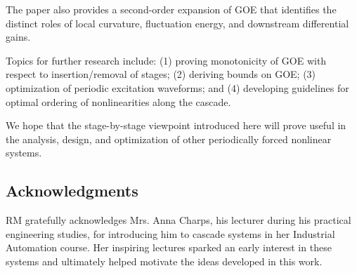 \documentclass[onecolumn]{IEEEtran}
\begin{document}
  The paper also provides a
   second-order expansion of GOE
   that identifies the distinct roles of local curvature, fluctuation energy, and downstream differential gains. 

 
Topics for further research include: 
(1) proving monotonicity of GOE with respect to insertion/removal of stages;
(2) deriving bounds on GOE;
(3) optimization of periodic excitation waveforms; 
and (4) developing guidelines 
for optimal ordering of nonlinearities along the  cascade.

 We hope that the stage-by-stage viewpoint introduced here will prove useful in the analysis,  design, and optimization  of  other periodically forced nonlinear systems.



\subsection*{Acknowledgments}
RM gratefully acknowledges Mrs. Anna Charps, his lecturer during his practical engineering studies, for introducing him to cascade systems in her Industrial Automation course. Her inspiring lectures sparked an early interest in these systems and ultimately helped motivate the ideas developed in this work.
 
\end{document}
